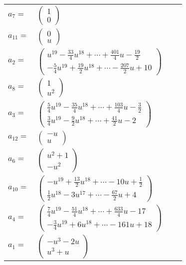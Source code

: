 \documentclass[1p]{elsarticle_modified}
\theoremstyle{definition}
\begin{document}
\begin{tabular}{m{7pt} m{180pt} m{7pt} m{180pt} }
\flushright $a_{7}=$&$\begin{pmatrix}1\\0\end{pmatrix}$ \\
\flushright $a_{11}=$&$\begin{pmatrix}0\\u\end{pmatrix}$ \\
\flushright $a_{2}=$&$\begin{pmatrix}u^{19}-\frac{33}{4} u^{18}+\cdots+\frac{401}{4} u-\frac{19}{2}\\-\frac{5}{4} u^{19}+\frac{19}{2} u^{18}+\cdots-\frac{207}{2} u+10\end{pmatrix}$ \\
\flushright $a_{8}=$&$\begin{pmatrix}1\\u^2\end{pmatrix}$ \\
\flushright $a_{3}=$&$\begin{pmatrix}\frac{5}{4} u^{19}-\frac{35}{4} u^{18}+\cdots+\frac{103}{4} u-\frac{3}{2}\\\frac{3}{4} u^{19}-\frac{9}{2} u^{18}+\cdots+\frac{41}{2} u-2\end{pmatrix}$ \\
\flushright $a_{12}=$&$\begin{pmatrix}- u\\u\end{pmatrix}$ \\
\flushright $a_{6}=$&$\begin{pmatrix}u^2+1\\- u^2\end{pmatrix}$ \\
\flushright $a_{10}=$&$\begin{pmatrix}- u^{19}+\frac{13}{2} u^{18}+\cdots-10 u+\frac{1}{2}\\\frac{1}{2} u^{18}-3 u^{17}+\cdots-\frac{67}{2} u+4\end{pmatrix}$ \\
\flushright $a_{4}=$&$\begin{pmatrix}\frac{7}{4} u^{19}-\frac{51}{4} u^{18}+\cdots+\frac{633}{4} u-17\\-\frac{3}{4} u^{19}+6 u^{18}+\cdots-161 u+18\end{pmatrix}$ \\
\flushright $a_{1}=$&$\begin{pmatrix}- u^3-2 u\\u^3+u\end{pmatrix}$ \\

\end{tabular}
\end{document}
